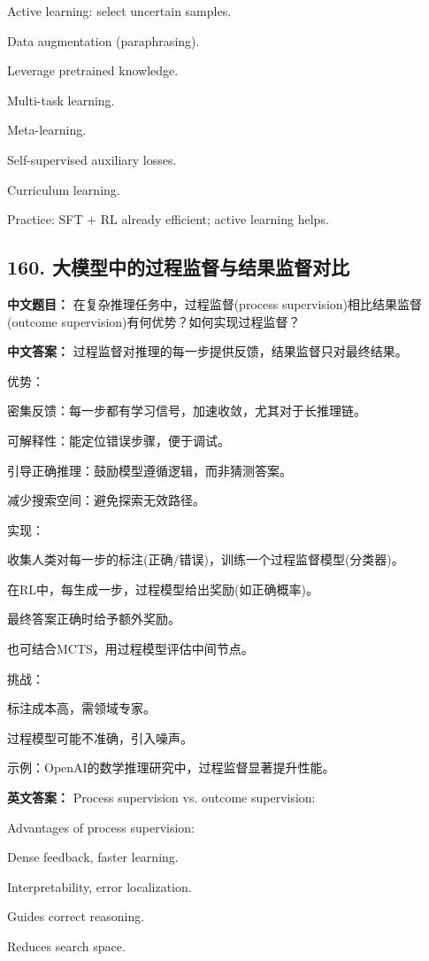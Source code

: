 \documentclass[10pt,a4paper]{ctexart}
\begin{document}
Active learning: select uncertain samples.

Data augmentation (paraphrasing).

Leverage pretrained knowledge.

Multi-task learning.

Meta-learning.

Self-supervised auxiliary losses.

Curriculum learning.

Practice: SFT + RL already efficient; active learning helps.

\subsection*{160. 大模型中的过程监督与结果监督对比}
\textbf{中文题目：} 在复杂推理任务中，过程监督(process supervision)相比结果监督(outcome supervision)有何优势？如何实现过程监督？

\textbf{中文答案：}
过程监督对推理的每一步提供反馈，结果监督只对最终结果。

优势：

密集反馈：每一步都有学习信号，加速收敛，尤其对于长推理链。

可解释性：能定位错误步骤，便于调试。

引导正确推理：鼓励模型遵循逻辑，而非猜测答案。

减少搜索空间：避免探索无效路径。

实现：

收集人类对每一步的标注(正确/错误)，训练一个过程监督模型(分类器)。

在RL中，每生成一步，过程模型给出奖励(如正确概率)。

最终答案正确时给予额外奖励。

也可结合MCTS，用过程模型评估中间节点。

挑战：

标注成本高，需领域专家。

过程模型可能不准确，引入噪声。

示例：OpenAI的数学推理研究中，过程监督显著提升性能。

\textbf{英文答案：}
Process supervision vs. outcome supervision:

Advantages of process supervision:

Dense feedback, faster learning.

Interpretability, error localization.

Guides correct reasoning.

Reduces search space.
\end{document}

